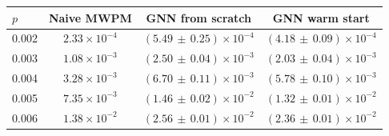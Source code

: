 \begin{tabular}{lccc}
\toprule
$p$ & Naive MWPM & GNN from scratch & GNN warm start \\
\midrule
0.002 & $2.33\times10^{-4}$ & $(5.49\,\pm\,0.25)\times10^{-4}$ & $(4.18\,\pm\,0.09)\times10^{-4}$ \\
0.003 & $1.08\times10^{-3}$ & $(2.50\,\pm\,0.04)\times10^{-3}$ & $(2.03\,\pm\,0.04)\times10^{-3}$ \\
0.004 & $3.28\times10^{-3}$ & $(6.70\,\pm\,0.11)\times10^{-3}$ & $(5.78\,\pm\,0.10)\times10^{-3}$ \\
0.005 & $7.35\times10^{-3}$ & $(1.46\,\pm\,0.02)\times10^{-2}$ & $(1.32\,\pm\,0.01)\times10^{-2}$ \\
0.006 & $1.38\times10^{-2}$ & $(2.56\,\pm\,0.01)\times10^{-2}$ & $(2.36\,\pm\,0.01)\times10^{-2}$ \\
\bottomrule
\end{tabular}
